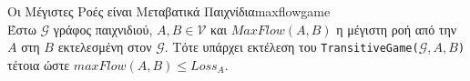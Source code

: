 {}
\begin{lemmagr}{Οι Μέγιστες Ροές είναι Μεταβατικά Παιχνίδια}{maxflowgame} \ \\
  Έστω $\mathcal{G}$ γράφος παιχνιδιού, $A, B \in \mathcal{V}$ και $MaxFlow\left(A, B\right)$ η μέγιστη ροή από την $A$ στη
  $B$ εκτελεσμένη στον $\mathcal{G}$. Τότε υπάρχει εκτέλεση του \texttt{\textlatin{TransitiveGame}(}$\mathcal{G}, A, B$\texttt{)}
  τέτοια ώστε $maxFlow\left(A, B\right) \leq Loss_A$.
\end{lemmagr}
